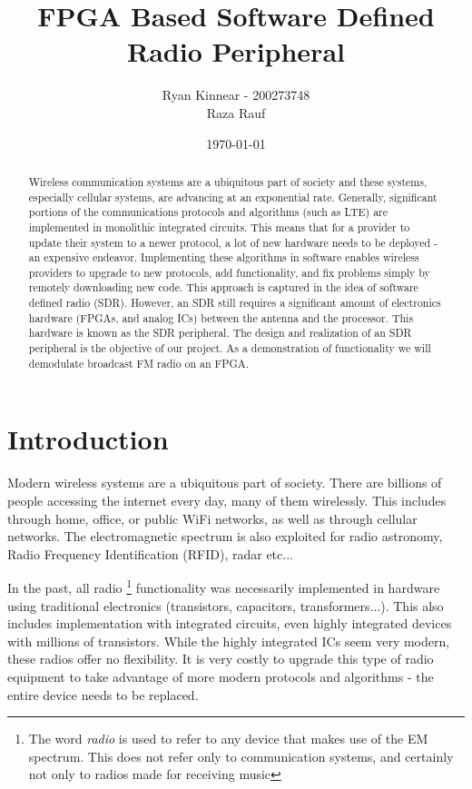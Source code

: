 \documentclass[a4paper, 12pt, notitlepage]{article}
\author{Ryan Kinnear - 200273748 \\ Raza Rauf}
\title{FPGA Based Software Defined Radio Peripheral}
\date{\today}
\begin{document}
\maketitle

\begin{abstract}
Wireless communication systems are a ubiquitous part of society and these systems, especially cellular systems, are advancing at an exponential rate.  Generally, significant portions of the communications protocols and algorithms (such as LTE) are implemented in monolithic integrated circuits.  This means that for a provider to update their system to a newer protocol, a lot of new hardware needs to be deployed - an expensive endeavor.  Implementing these algorithms in software enables wireless providers to upgrade to new protocols, add functionality, and fix problems simply by remotely downloading new code.  This approach is captured in the idea of software defined radio (SDR).  However, an SDR still requires a significant amount of electronics hardware (FPGAs, and analog ICs) between the antenna and the processor.  This hardware is known as the SDR peripheral.  The design and realization of an SDR peripheral is the objective of our project.  As a demonstration of functionality we will demodulate broadcast FM radio on an FPGA.
\end{abstract}

\newpage
\tableofcontents
\newpage
\listoffigures
\newpage

\section{Introduction}
\label{sec:intro}
Modern wireless systems are a ubiquitous part of society.  There are billions of people accessing the internet every day, many of them wirelessly.  This includes through home, office, or public WiFi networks, as well as through cellular networks.  The electromagnetic spectrum is also exploited for radio astronomy, Radio Frequency Identification (RFID), radar etc...  

In the past, all radio \footnote{The word \textit{radio} is used to refer to any device that makes use of the EM spectrum.  This does not refer only to communication systems, and certainly not only to radios made for receiving music} functionality was necessarily implemented in hardware using traditional electronics (transistors, capacitors, transformers...).  This also includes implementation with integrated circuits, even highly integrated devices with millions of transistors.  While the highly integrated ICs seem very modern, these radios offer no flexibility.  It is very costly to upgrade this type of radio equipment to take advantage of more modern protocols and algorithms - the entire device needs to be replaced.
\end{document}
